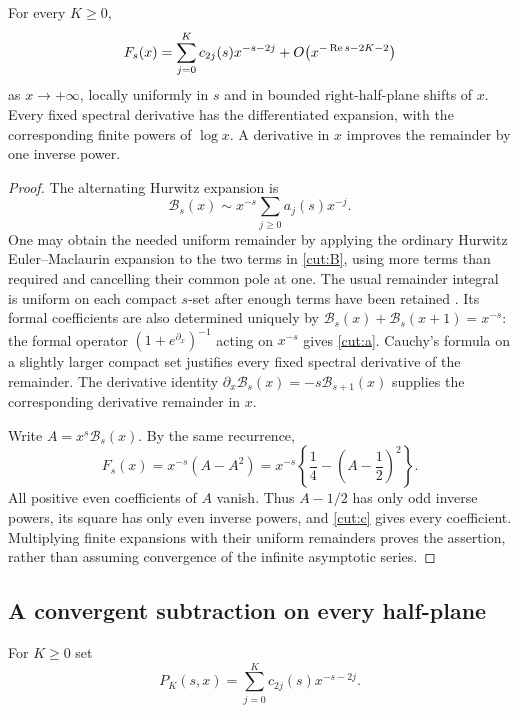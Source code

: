 \begin{proposition}\label{cut:expansion}
For every $K\ge0$,
\begin{equation}\label{cut:expansioneq}
 F_s(x)=\sum_{j=0}^{K}c_{2j}(s)x^{-s-2j}
           +O\bigl(x^{-\operatorname{Re} s-2K-2}\bigr)
\end{equation}
as $x\to+\infty$, locally uniformly in $s$ and in bounded right-half-plane
shifts of $x$. Every fixed spectral derivative has the differentiated
expansion, with the corresponding finite powers of $\log x$. A derivative
in $x$ improves the remainder by one inverse power.
\end{proposition}
\begin{proof}
The alternating Hurwitz expansion is
\[
 \mathcal B_s(x)\sim x^{-s}\sum_{j\ge0}a_j(s)x^{-j}.
\]
One may obtain the needed uniform remainder by applying the ordinary
Hurwitz Euler--Maclaurin expansion to the two terms in \eqref{cut:B},
using more terms than required and cancelling their common pole at one.
The usual remainder integral is uniform on each compact $s$-set after
enough terms have been retained \cite{DLMFZeta,HuKimAsymptotic}.
Its formal coefficients are also determined uniquely by
$\mathcal B_s(x)+\mathcal B_s(x+1)=x^{-s}$: the formal operator
$(1+e^{\partial_x})^{-1}$ acting on $x^{-s}$ gives \eqref{cut:a}.
Cauchy's formula on a slightly larger compact set justifies every fixed
spectral derivative of the remainder. The derivative identity
$\partial_x\mathcal B_s(x)=-s\mathcal B_{s+1}(x)$ supplies the
corresponding derivative remainder in $x$.

Write $A=x^s\mathcal B_s(x)$. By the same recurrence,
\[
 F_s(x)=x^{-s}(A-A^2)
       =x^{-s}\left\{\frac14-\left(A-\frac12\right)^2\right\}.
\]
All positive even coefficients of $A$ vanish. Thus $A-1/2$ has only
odd inverse powers, its square has only even inverse powers, and
\eqref{cut:c} gives every coefficient. Multiplying finite expansions with
their uniform remainders proves the assertion, rather than assuming
convergence of the infinite asymptotic series.
\end{proof}

\subsection{A convergent subtraction on every half-plane}

For $K\ge0$ set
\begin{equation}\label{cut:PK}
 P_K(s,x)=\sum_{j=0}^{K}c_{2j}(s)x^{-s-2j}.
\end{equation}

